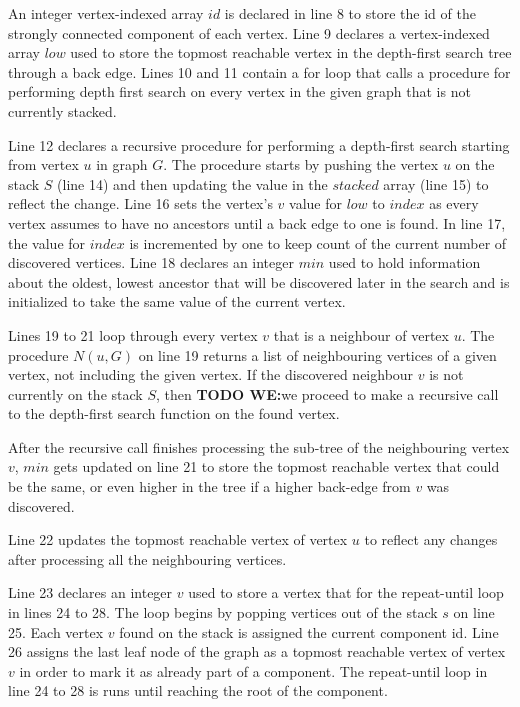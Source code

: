 \documentclass{l4proj}
\begin{document}
\noindent An integer vertex-indexed array $id$ is declared in line 8 to store the id of the strongly connected component of each vertex. Line 9 declares a vertex-indexed array $low$ used to store the topmost reachable vertex in the depth-first search tree through a back edge. Lines 10 and 11 contain a for loop that calls a procedure for performing depth first search on every vertex in the given graph that is not currently stacked.

\noindent Line 12 declares a recursive procedure for performing a depth-first search starting from vertex $u$ in graph $G$. The procedure starts by pushing the vertex $u$ on the stack $S$ (line 14) and then updating the value in the $stacked$ array (line 15) to reflect the change. Line 16 sets the vertex's $v$ value for $low$ to $index$ as every vertex assumes to have no ancestors until a back edge to one is found. In line 17, the value for $index$ is incremented by one to keep count of the current number of discovered vertices. Line 18 declares an integer $min$ used to hold information about the oldest, lowest ancestor that will be discovered later in the search and is initialized to take the same value of the current vertex.

\noindent Lines 19 to 21 loop through every vertex $v$ that is a neighbour of vertex $u$. The procedure $N(u, G)$ on line 19 returns a list of neighbouring vertices of a given vertex, not including the given vertex. If the discovered neighbour $v$ is not currently on the stack $S$, then \textbf{TODO WE:}we proceed to make a recursive call to the depth-first search function on the found vertex.

\noindent After the recursive call finishes processing the sub-tree of the neighbouring vertex $v$, $min$ gets updated on line 21 to store the topmost reachable vertex that could be the same, or even higher in the tree if a higher back-edge from $v$ was discovered.

\noindent Line 22 updates the topmost reachable vertex of vertex $u$ to reflect any changes after processing all the neighbouring vertices.

\noindent Line 23 declares an integer $v$ used to store a vertex that for the repeat-until loop in lines 24 to 28. The loop begins by popping vertices out of the stack $s$ on line 25. Each vertex $v$ found on the stack is assigned the current component id. Line 26 assigns the last leaf node of the graph as a topmost reachable vertex of vertex $v$ in order to mark it as already part of a component. The repeat-until loop in line 24 to 28 is runs until reaching the root of the component.
\end{document}
